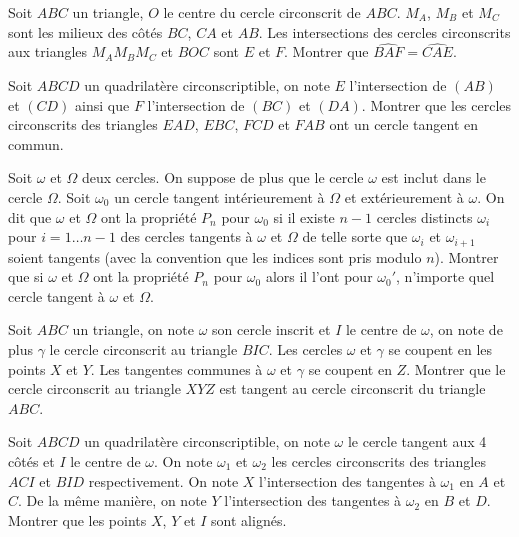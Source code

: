 \begin{exo}
Soit $ABC$ un triangle, $O$ le centre du cercle circonscrit de $ABC$. $M_A$, $M_B$ et $M_C$ sont les milieux des côtés $BC$, $CA$ et $AB$. Les intersections des cercles circonscrits aux triangles $M_AM_BM_C$ et $BOC$ sont $E$ et $F$. Montrer que $\widehat{BAF}=\widehat{CAE}$.
\end{exo}

\begin{exo}
Soit $ABCD$ un quadrilatère circonscriptible, on note $E$ l'intersection de $(AB)$ et $(CD)$ ainsi que $F$ l'intersection de $(BC)$ et $(DA)$. Montrer que les cercles circonscrits des triangles $EAD$, $EBC$, $FCD$ et $FAB$ ont un cercle tangent en commun.
\end{exo}

\begin{exo}
Soit $\omega$ et $\Omega$ deux cercles. On suppose de plus que le cercle $\omega$ est inclut dans le cercle $\Omega$. Soit $\omega_0$ un cercle tangent intérieurement à $\Omega$ et extérieurement à $\omega$. On dit que $\omega$ et $\Omega$ ont la propriété $P_n$ pour $\omega_0$ si il existe $n-1$ cercles distincts $\omega_{i}$ pour $i=1 \ldots n-1$ des cercles tangents à $\omega$ et $\Omega$ de telle sorte que $\omega_i$ et $\omega_{i+1}$ soient tangents (avec la convention que les indices sont pris modulo $n$). Montrer que si $\omega$ et $\Omega$ ont la propriété $P_n$ pour $\omega_0$ alors il l'ont pour $\omega_0'$, n'importe quel cercle tangent à $\omega$ et $\Omega$.
\end{exo}

\begin{exo}
Soit $ABC$ un triangle, on note $\omega$ son cercle inscrit et $I$ le centre de $\omega$, on note de plus $\gamma$ le cercle circonscrit au triangle $BIC$. Les cercles $\omega$ et $\gamma$ se coupent en les points $X$ et $Y$. Les tangentes communes à $\omega$ et $\gamma$ se coupent en $Z$. Montrer que le cercle circonscrit au triangle $XYZ$ est tangent au cercle circonscrit du triangle $ABC$.
\end{exo}


\begin{exo}
Soit $ABCD$ un quadrilatère circonscriptible, on note $\omega$ le cercle tangent aux 4 côtés et $I$ le centre de $\omega$. On note $\omega_1$ et $\omega_2$ les cercles circonscrits des triangles $ACI$ et $BID$ respectivement. On note $X$ l'intersection des tangentes à $\omega_1$ en $A$ et $C$. De la même manière, on note $Y$ l'intersection des tangentes à $\omega_2$ en $B$ et $D$. Montrer que les points $X$, $Y$ et $I$ sont alignés.
\end{exo}


